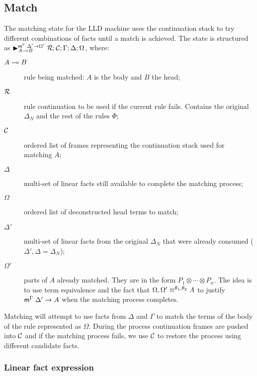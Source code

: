\subsection{Match}\label{sec:lld_body_match}

The matching state for the LLD machine uses the continuation stack to try
different combinations of facts until a match is achieved.  The state is
structured as $\matstate{A \lolli
   B}{\rulestk}{\lstack{C}}{\Gamma}{\Delta}{\Omega}{\Delta' \rightarrow
      \Omega'}$, where:

\begin{description}
   \item[$A \lolli B$] rule being matched: $A$ is the body and $B$ the head;

   \item[$\rulestk$] rule continuation to be used if the current rule fails.
   Contains the original $\Delta_N$ and the rest of the rules $\Phi$;

   \item[$\lstack{C}$] ordered list of frames representing the continuation
   stack used for matching $A$;

   \item[$\Delta$] multi-set of linear facts still available to complete the
   matching process;

   \item[$\Omega$] ordered list of deconstructed head terms to match;

   \item[$\Delta'$] multi-set of linear facts from the original $\Delta_N$ that
   were already consumed ($\Delta', \Delta = \Delta_N$);

   \item[$\Omega'$] parts of $A$ already matched. They are in the form $P_1
   \otimes \dotsb \otimes P_n$. The idea is to use term equivalence and the fact
   that $\feq{\Omega, \Omega'}{A}$ to justify $\mz{\Gamma}{\Delta'}{A}$ when the
   matching process completes.

\end{description}

Matching will attempt to use facts from $\Delta$ and $\Gamma$ to match the terms
of the body of the rule represented as $\Omega$. During the process
continuation frames are pushed into $\lstack{C}$ and if the matching process
fails, we use $\lstack{C}$ to restore the process using different
candidate facts.

\subsubsection{Linear fact expression}

